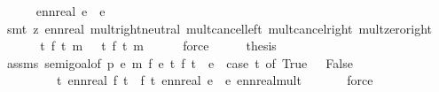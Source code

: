 \begin{isabellebody}
\ \ \ \ \isamarkupfalse%
\ {\isacartoucheopen}ennreal\ e{}\ {\isacharequal}{\kern0pt}\ e{\isacartoucheclose}\isanewline
\ \ \ \ \isamarkupfalse%
\ {\isacharparenleft}{\kern0pt}smt\ {\isacharparenleft}{\kern0pt}z{}{\isacharparenright}{\kern0pt}\ ennreal{\isacharunderscore}{\kern0pt}{}\ mult{\isachardot}{\kern0pt}right{\isacharunderscore}{\kern0pt}neutral\ mult{\isacharunderscore}{\kern0pt}cancel{\isacharunderscore}{\kern0pt}left{}\ mult{\isacharunderscore}{\kern0pt}cancel{\isacharunderscore}{\kern0pt}right{}\ mult{\isacharunderscore}{\kern0pt}zero{\isacharunderscore}{\kern0pt}right{\isacharparenright}{\kern0pt}\isanewline
\ \ \isamarkupfalse%
\ \isamarkupfalse%
\ {\isachardoublequoteopen}{\isacharparenleft}{\kern0pt}{\isasymintegral}\isactrlsup {\isacharplus}{\kern0pt}\ t{\isachardot}{\kern0pt}\ {\isacharparenleft}{\kern0pt}f{}\ t{\isacharparenright}{\kern0pt}\ {\isasympartial}m{\isacharparenright}{\kern0pt}\ {\isacharequal}{\kern0pt}\ {\isasymintegral}\isactrlsup {\isacharplus}{\kern0pt}\ t{\isachardot}{\kern0pt}\ {\isacharparenleft}{\kern0pt}f\ t{\isacharparenright}{\kern0pt}\ {\isasympartial}m{\isachardoublequoteclose}\isanewline
\ \ \ \ \isamarkupfalse%
\ force\isanewline
\ \ \isamarkupfalse%
\ \isamarkupfalse%
\ {\isacharquery}{\kern0pt}thesis\isanewline
\ \ \ \ \isamarkupfalse%
\ assms\ semi{\isacharunderscore}{\kern0pt}goal{}{\isacharbrackleft}{\kern0pt}of\ p{}\ e{}\ m\ f{}{\isacharbrackright}{\kern0pt}\ {\isacartoucheopen}e{}{\isasymge}{}{\isacartoucheclose}\ {\isacartoucheopen}{\isasymAnd}t{\isachardot}{\kern0pt}\ f{}\ t\ {\isacharequal}{\kern0pt}\ e{}\ {\isacharasterisk}{\kern0pt}\ {\isacharparenleft}{\kern0pt}case\ t\ of\ True\ {\isasymRightarrow}\ {}{\isacharbar}{\kern0pt}\ False\ {\isasymRightarrow}\ {}{\isacharparenright}{\kern0pt}{\isacartoucheclose}\isanewline
\ \ \ \ \ \ \ \ \ {\isacartoucheopen}{\isasymAnd}t{\isachardot}{\kern0pt}\ ennreal\ {\isacharparenleft}{\kern0pt}f{}\ t{\isacharparenright}{\kern0pt}\ {\isacharequal}{\kern0pt}\ f\ t{\isacartoucheclose}\ {\isacartoucheopen}ennreal\ e{}\ {\isacharequal}{\kern0pt}\ e{\isacartoucheclose}\ ennreal{\isacharunderscore}{\kern0pt}mult{\isacharprime}{\kern0pt}{\isacharprime}{\kern0pt}\ \isanewline
\ \ \ \ \isamarkupfalse%
\ force\isanewline

\end{isabellebody}
